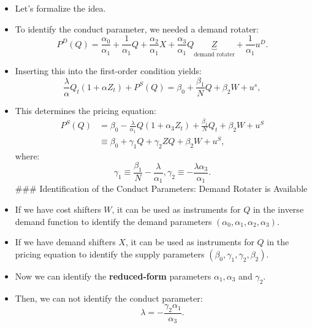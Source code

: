 \documentclass[
]{book}
\begin{document}
\begin{itemize}
\item
  Let's formalize the idea.
\item
  To identify the conduct parameter, we needed a demand rotater:
  \begin{equation}
  P^D(Q) = \frac{\alpha_0}{\alpha_1} + \frac{1}{\alpha_1}Q + \frac{\alpha_2}{\alpha_1} X + \frac{\alpha_3}{\alpha_1} Q \underbrace{Z}_{\text{demand rotater}} +  \frac{1}{\alpha_1}u^D.
  \end{equation}
\item
  Inserting this into the first-order condition yields:
  \begin{equation}
  \frac{\lambda}{\alpha} Q_t (1 + \alpha Z_t)+ P^S(Q) = \beta_0 + \frac{\beta_1}{N} Q + \beta_2 W + u^s,
  \end{equation}
\item
  This determines the pricing equation:
  \begin{equation}
  \begin{split}
  P^S(Q) &= \beta_0 - \frac{\lambda}{\alpha_1} Q(1 + \alpha_3 Z_t) + \frac{\beta_1}{N} Q_t + \beta_2 W + u^S\\
  &\equiv \beta_0 + \gamma_1 Q + \gamma_2 Z Q + \beta_2 W + u^S,
  \end{split}
  \end{equation}
  where:
  \begin{equation}
  \gamma_1 \equiv \frac{\beta_1}{N} - \frac{\lambda}{\alpha_1}, \gamma_2 \equiv - \frac{\lambda \alpha_3}{\alpha_1}.
  \end{equation}
  \#\#\# Identification of the Conduct Parameters: Demand Rotater is Available
\item
  If we have cost shifters \(W\), it can be used as instruments for \(Q\) in the inverse demand function to identify the demand parameters \((\alpha_0, \alpha_1, \alpha_2, \alpha_3)\).
\item
  If we have demand shifters \(X\), it can be used as instruments for \(Q\) in the pricing equation to identify the supply parameters \((\beta_0, \gamma_1, \gamma_2, \beta_2)\).
\item
  Now we can identify the \textbf{reduced-form} parameters \(\alpha_1, \alpha_3\) and \(\gamma_2\).
\item
  Then, we can not identify the conduct parameter:
  \begin{equation}
  \lambda = - \frac{\gamma_2 \alpha_1}{\alpha_3}.
  \end{equation}
\end{itemize}
\end{document}
